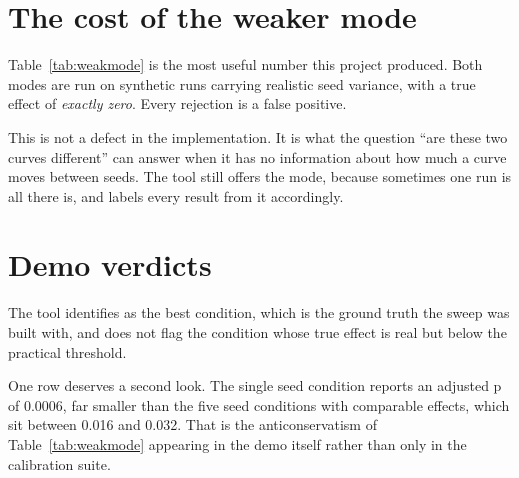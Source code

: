 \documentclass[11pt,a4paper]{report}
\begin{document}
\section{The cost of the weaker mode}
\label{sec:weakcost}

Table~\ref{tab:weakmode} is the most useful number this project produced. Both
modes are run on synthetic runs carrying realistic seed variance, with a true
effect of \emph{exactly zero}. Every rejection is a false positive.

\begin{table}[htbp]
\centering
\small

\caption{False positive rates when the true effect is zero and seed variance is
present. Comparing one run against one run, on data where nothing is different,
calls it a significant difference most of the time.}
\label{tab:weakmode}
\end{table}

This is not a defect in the implementation. It is what the question ``are these
two curves different'' can answer when it has no information about how much a
curve moves between seeds. The tool still offers the mode, because sometimes one
run is all there is, and labels every result from it accordingly.

\section{Demo verdicts}

\begin{table}[htbp]
\centering
\scriptsize

\caption{All \factcomparisons{} comparisons against \factbaseline{}, ranked by
severity: \factregressions{} regressions and \factimprovements{} improvements.
Rows marked $\dagger$ come from the weaker single run mode. Permutation seed
\factpermutationseed{}.}
\label{tab:verdicts}
\end{table}

The tool identifies \factbestcandidate{} as the best condition, which is the
ground truth the sweep was built with, and does not flag the condition whose true
effect is real but below the practical threshold.

One row deserves a second look. The single seed condition reports an adjusted p
of 0.0006, far smaller than the five seed conditions with comparable effects,
which sit between 0.016 and 0.032. That is the anticonservatism of
Table~\ref{tab:weakmode} appearing in the demo itself rather than only in the
calibration suite.
\end{document}
